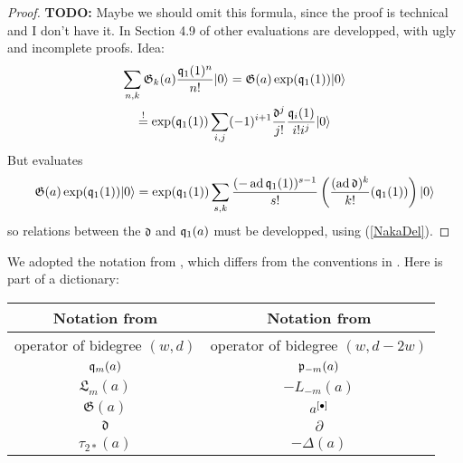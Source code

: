 \begin{proof}
\textbf{TODO:} Maybe we should omit this formula, since the proof is technical and I don't have it. In Section 4.9 of \cite{LehnSorger} other evaluations are developped, with ugly and incomplete proofs.
Idea:
\begin{gather*}
\sum_{n,k}\mathfrak{G}_k(a)\frac{\mathfrak{q}_1(1)^n}{n!}|0\rangle = \mathfrak{G}(a)\exp(\mathfrak{q}_1(1))|0\rangle \\
\stackrel{!}{=} \exp(\mathfrak{q}_1(1)) \sum_{i,j}(-1)^{i+1} \frac{\mathfrak d^j}{j!}\frac{\mathfrak{q}_i(1)}{i!i^j}|0\rangle
\end{gather*}
But \cite[Equation (4.6)]{LehnSorger} evaluates 
$$
 \mathfrak{G}(a)\exp(\mathfrak{q}_1(1))|0\rangle = \exp(\mathfrak{q}_1(1)) \sum_{s,k} \frac{(-\operatorname{ad} \mathfrak{q}_1(1))^{s-1}}{s!}\left(\frac{(\operatorname{ad} \mathfrak d)^k}{k!} (\mathfrak{q}_1(1)) \right)|0\rangle
$$
so relations between the $\mathfrak d$ and $\mathfrak{q}_1(a)$ must be developped, using (\ref{NakaDel}). 
\end{proof}


\begin{remark}
We adopted the notation from \cite{LiQinWang}, which differs from the conventions in \cite{LehnSorger}. Here is part of a dictionary:

\begin{tabular}{c|c} 
Notation from \cite{LiQinWang} & Notation from \cite{LehnSorger} \\\hline
operator of bidegree $(w,d)$ & operator of bidegree $(w,d-2w)$\\
$\mathfrak{q}_m(a) $ & $\mathfrak{p}_{-m}(a)$ \\
$ \mathfrak{L}_m(a) $ & $ - L_{-m}(a)$ \\
$\mathfrak{G}(a)$ & $a^{[\bullet]}$\\
$ \mathfrak{d} $ & $ \partial $ \\
$\tau_{2*}(a)$& $-\Delta(a)$
\end{tabular}
\end{remark}


